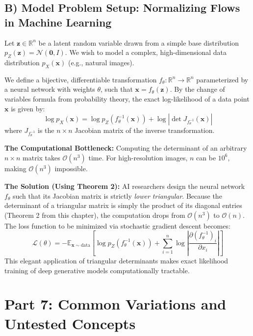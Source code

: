 \documentclass{article}
\begin{document}
\subsection{B) Model Problem Setup: Normalizing Flows in Machine Learning}
Let $\mathbf{z} \in \mathbb{R}^n$ be a latent random variable drawn from a simple base distribution $p_Z(\mathbf{z}) = \mathcal{N}(\mathbf{0}, I)$. We wish to model a complex, high-dimensional data distribution $p_X(\mathbf{x})$ (e.g., natural images). 

We define a bijective, differentiable transformation $f_\theta : \mathbb{R}^n \to \mathbb{R}^n$ parameterized by a neural network with weights $\theta$, such that $\mathbf{x} = f_\theta(\mathbf{z})$. By the change of variables formula from probability theory, the exact log-likelihood of a data point $\mathbf{x}$ is given by:
\[ \log p_X(\mathbf{x}) = \log p_Z(f_\theta^{-1}(\mathbf{x})) + \log \left| \det J_{f_\theta^{-1}}(\mathbf{x}) \right| \]
where $J_{f_\theta^{-1}}$ is the $n \times n$ Jacobian matrix of the inverse transformation.

\textbf{The Computational Bottleneck:} Computing the determinant of an arbitrary $n \times n$ matrix takes $\mathcal{O}(n^3)$ time. For high-resolution images, $n$ can be $10^6$, making $\mathcal{O}(n^3)$ impossible. 

\textbf{The Solution (Using Theorem 2):} AI researchers design the neural network $f_\theta$ such that its Jacobian matrix is strictly \textit{lower triangular}. Because the determinant of a triangular matrix is simply the product of its diagonal entries (Theorem 2 from this chapter), the computation drops from $\mathcal{O}(n^3)$ to $\mathcal{O}(n)$. The loss function to be minimized via stochastic gradient descent becomes:
\[ \mathcal{L}(\theta) = - \mathbb{E}_{\mathbf{x} \sim \text{data}} \left[ \log p_Z(f_\theta^{-1}(\mathbf{x})) + \sum_{i=1}^n \log \left| \frac{\partial (f_\theta^{-1})_i}{\partial x_i} \right| \right] \]
This elegant application of triangular determinants makes exact likelihood training of deep generative models computationally tractable.

\newpage
\section{Part 7: Common Variations and Untested Concepts}
\end{document}
